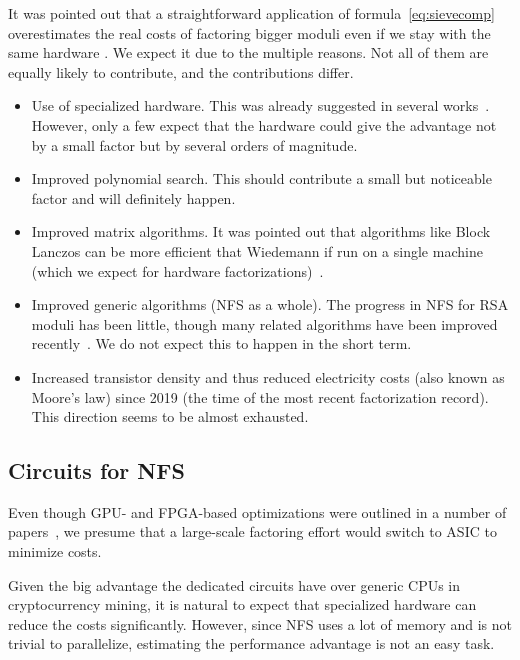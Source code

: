 \documentclass[a4paper]{article}
\begin{document}
It was pointed out that a straightforward application of formula~\eqref{eq:sievecomp} overestimates the real costs of factoring bigger moduli even if we stay with the same hardware \cite{DBLP:conf/eurocrypt/KleinjungDLPS17}. We expect it due to the multiple reasons. Not all of them are equally likely to contribute, and the contributions differ.
\begin{itemize}
    \item Use of specialized hardware. This was already suggested in several works~\cite{bernstein01,DBLP:conf/asiacrypt/LenstraSTT02,shamir2003factoring}. However, only a few expect that the hardware could give the advantage not by a small factor but by several orders of magnitude.
    \item Improved polynomial search. This should contribute a small but noticeable factor and will definitely happen.
    \item Improved matrix algorithms. It was pointed out that algorithms like Block Lanczos can be more efficient that Wiedemann if run on a single machine (which we expect for hardware factorizations)~\cite{thome2016modified}.
    \item Improved generic algorithms (NFS as a whole). The progress in NFS for RSA moduli has been little, though many related algorithms have been improved recently~\cite{DBLP:conf/crypto/0001B16}. We do not expect this to happen in the short term.
    \item Increased transistor density and thus reduced electricity costs (also known as Moore's law) since 2019 (the time of the most recent factorization record). This direction seems to be almost exhausted.
\end{itemize}
 
 \subsection{Circuits for NFS}
 
 
 Even though GPU- and FPGA-based optimizations were outlined in a number of papers~\cite{Archer10,DBLP:conf/ches/MieleBKL14}, we presume that a large-scale factoring effort would switch to ASIC to minimize costs.
 
 
 Given the big advantage the dedicated circuits have over generic CPUs in cryptocurrency mining, it is natural to expect that specialized hardware can reduce the costs significantly. However, since NFS uses a lot of memory and is not trivial to parallelize, estimating the performance advantage is not an easy task.
 
\end{document}

